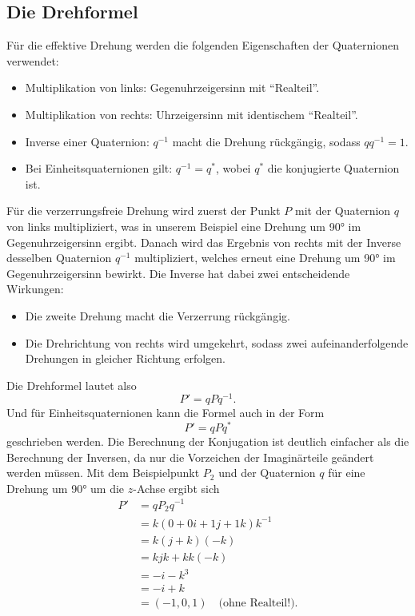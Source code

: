 \subsection{Die Drehformel\label{qa:section:drehungen:drehformel}}%
Für die effektive Drehung werden die folgenden Eigenschaften der 
Quaternionen verwendet:
\begin{itemize}
    \item Multiplikation von links: Gegenuhrzeigersinn mit ``Realteil''.
    \item Multiplikation von rechts: Uhrzeigersinn mit identischem ``Realteil''.
    \item Inverse einer Quaternion: $q^{-1}$ macht die Drehung
    rückgängig, sodass $q q^{-1} = 1$.
    \item Bei Einheitsquaternionen gilt: $q^{-1} = q^*$, wobei $q^*$ 
    die konjugierte Quaternion ist.
\end{itemize}
Für die verzerrungsfreie Drehung wird zuerst der Punkt $P$ mit der 
Quaternion $q$ von links multipliziert, was in unserem Beispiel 
eine Drehung um 90° im Gegenuhrzeigersinn ergibt. Danach wird das 
Ergebnis von rechts mit der Inverse desselben Quaternion $q^{-1}$ 
multipliziert, welches erneut eine Drehung um 90° im 
Gegenuhrzeigersinn bewirkt. Die Inverse hat dabei zwei 
entscheidende Wirkungen:
\begin{itemize}
    \item Die zweite Drehung macht die Verzerrung rückgängig.
    \item Die Drehrichtung von rechts wird umgekehrt, sodass zwei 
    aufeinanderfolgende Drehungen in gleicher Richtung erfolgen.
\end{itemize}
Die Drehformel lautet also
%
%
\begin{equation*}
    P' = q P q^{-1}.
\end{equation*}
Und für Einheitsquaternionen kann die Formel auch in der Form
\begin{equation*}
    P' = q P q^*
\end{equation*}
geschrieben werden. Die Berechnung der Konjugation ist deutlich
einfacher als die Berechnung der Inversen, da nur die Vorzeichen
der Imaginärteile geändert werden müssen.
Mit dem Beispielpunkt $P_2$ und der Quaternion $q$ für eine Drehung
um 90° um die $z$-Achse ergibt sich
\begin{align*}
    P' &= q P_2 q^{-1} \\
    &= k (0 + 0i + 1\!j + 1k) k^{-1} \\
    &= k (j + k) (-k) \\
    &= k\!jk + kk(-k) \\
    &= -i - k^3 \\
    &= -i + k \\
    &= (-1, 0, 1) \quad \text{(ohne Realteil!)}.
\end{align*}
